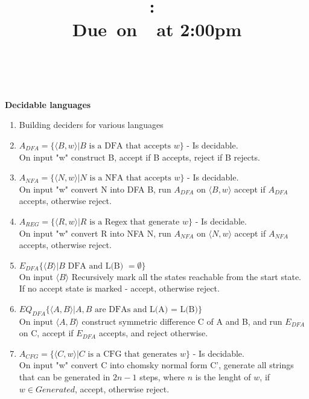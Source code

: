 \documentclass{article}
\title{
  \vspace{2in}
  \textmd{\textbf{\hmwkClass:\ \hmwkTitle}}\\
  \normalsize\vspace{0.1in}\small{Due\ on\ \hmwkDueDate\ at 2:00pm}\\
  \vspace{0.1in}\large{\textit{\hmwkClassInstructor\ \hmwkClassTime}}
  \vspace{3in}
}
\author{\textbf{\hmwkAuthorName}}
\date{}
\newcommand\curl[1]{\{#1\}}
\newcommand\angl[1]{\langle #1 \rangle}}
\begin{document}
\maketitle

\pagebreak

\textbf{Decidable languages}
\begin{enumerate}[1., leftmargin = 0.5cm]
\itemsep0em
    \item Building deciders for various languages
    
    \item $A_{DFA} = \curl{\langle B, w \rangle | B \text{ is a DFA that accepts } w }$ - Is decidable. \\
        On input "w" construct B, accept if B accepts, reject if B rejects.

    \item $A_{NFA} = \curl{\langle N, w \rangle | N \text{ is a NFA that accepts } w }$ - Is decidable. \\
        On input "w" convert N into DFA B, run $A_{DFA}$ on $\langle B, w \rangle $ accept if $A_{DFA}$ accepts, otherwise reject.

    \item $A_{REG} = \curl{\langle R, w \rangle | R \text{ is a Regex that generate } w }$ - Is decidable. \\
        On input "w" convert R into NFA N, run $A_{NFA}$ on $\langle N, w \rangle $ accept if $A_{NFA}$ accepts, otherwise reject.

    \item $E_{DFA} \curl{\langle B \rangle | B \text{ DFA and L(B) } = \emptyset}$ \\
        On input $\langle B \rangle$ Recursively mark all the states reachable from the start state. If no accept state is marked - accept, otherwise reject.

    \item $EQ_{DFA}  \curl{\angl{A, B} | A,B \text{ are DFAs and L(A) = L(B)}}$ \\
        On input $\angl{A,B}$ construct symmetric difference C of A and B, and run $E_{DFA}$ on C, accept if $E_{DFA}$ accepts, and reject otherwise.
    
    \item $A_{CFG} = \curl{\langle C, w \rangle | C \text{ is a CFG that generates } w }$ - Is decidable. \\
        On input "w" convert C into chomsky normal form C', generate all strings that can be generated in $2n - 1 $ steps, where
        $n$ is the lenght of $w$, if $w \in Generated$, accept, otherwise
        reject.


\end{enumerate}
\end{document}
